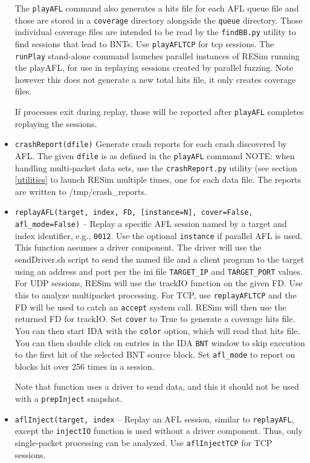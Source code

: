 \documentclass[titlepage]{article}
\begin{document}
\begin{itemize}
The {\tt playAFL} command also generates a hits file for each AFL queue file and those are stored in a {\tt coverage} directory alongside the {\tt queue} directory.
Those individual coverage files are intended to be read by the {\tt findBB.py} utility to find sessions that lead to BNTs.  Use {\tt playAFLTCP} for tcp sessions.
The {\tt runPlay} stand-alone command launches parallel instances of RESim running the playAFL, for use in replaying sessions created by parallel fuzzing.  Note however this 
does not generate a new total hits file, it only creates coverage files.  

If processes exit during replay, those will be reported after {\tt playAFL} completes replaying the sessions.

\item{\tt crashReport(dfile)} Generate crash reports for each crash discovered by AFL.  The given {\tt dfile} is as defined in the {\tt playAFL} command
NOTE: when handling multi-packet data sets, use the {\tt crashReport.py} utility (see section \ref{utilities} to launch RESim multiple times,
one for each data file.  The reports are written to /tmp/crash\_reports.

\item{\tt replayAFL(target, index, FD, [instance=N], cover=False, afl\_mode=False)} -- Replay a specific AFL session named by a target and index identifier, e.g., {\tt 0012}.  Use the optional {\tt instance} if parallel AFL is used.  This function assumes a driver component. The driver will use the sendDriver.sh script to send the named file and
a client program to the target using an address and port per the ini file {\tt TARGET\_IP} and {\tt TARGET\_PORT} values.  For UDP sessions, RESim will use the trackIO function on the given FD.  Use this to analyze multipacket processing.  For TCP, use {\tt replayAFLTCP} and the FD will be used to catch an {\tt accept} system call.  RESim will then use the returned FD for trackIO.  Set {\tt cover} to True to generate a coverage hits file.  You can then start IDA with the {\tt color} option, which
will read that hits file.   You can then double click on entries in the IDA {\tt BNT} window to skip execution to the first hit of the selected BNT source block.
Set {\tt afl\_mode} to report on blocks hit over 256 times in a session.

Note that function uses a driver to send data, and this it should not be used with a {\tt prepInject} snapshot.

\item{\tt aflInject(target, index} -- Replay an AFL session, similar to {\tt replayAFL}, except the {\tt injectIO} function is used without
a driver component.  Thus, only single-packet processing can be analyzed.  Use {\tt aflInjectTCP} for TCP sessions.


\end{itemize}
\end{document}
